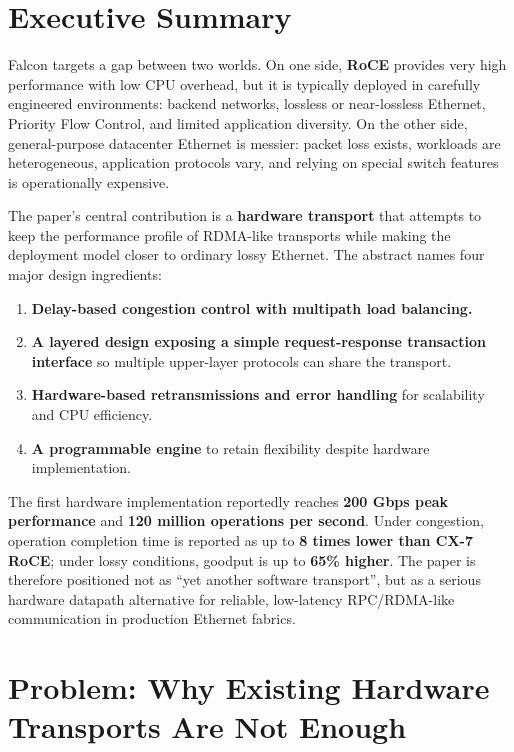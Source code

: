 \documentclass[11pt]{article}
\begin{document}
\section{Executive Summary}

Falcon targets a gap between two worlds. On one side, \textbf{RoCE} provides very high performance with low CPU overhead, but it is typically deployed in carefully engineered environments: backend networks, lossless or near-lossless Ethernet, Priority Flow Control, and limited application diversity. On the other side, general-purpose datacenter Ethernet is messier: packet loss exists, workloads are heterogeneous, application protocols vary, and relying on special switch features is operationally expensive.

The paper's central contribution is a \textbf{hardware transport} that attempts to keep the performance profile of RDMA-like transports while making the deployment model closer to ordinary lossy Ethernet. The abstract names four major design ingredients:

\begin{enumerate}
  \item \textbf{Delay-based congestion control with multipath load balancing.}
  \item \textbf{A layered design exposing a simple request-response transaction interface} so multiple upper-layer protocols can share the transport.
  \item \textbf{Hardware-based retransmissions and error handling} for scalability and CPU efficiency.
  \item \textbf{A programmable engine} to retain flexibility despite hardware implementation.
\end{enumerate}

The first hardware implementation reportedly reaches \textbf{200 Gbps peak performance} and \textbf{120 million operations per second}. Under congestion, operation completion time is reported as up to \textbf{8 times lower than CX-7 RoCE}; under lossy conditions, goodput is up to \textbf{65\% higher}. The paper is therefore positioned not as ``yet another software transport'', but as a serious hardware datapath alternative for reliable, low-latency RPC/RDMA-like communication in production Ethernet fabrics.

\section{Problem: Why Existing Hardware Transports Are Not Enough}
\end{document}
